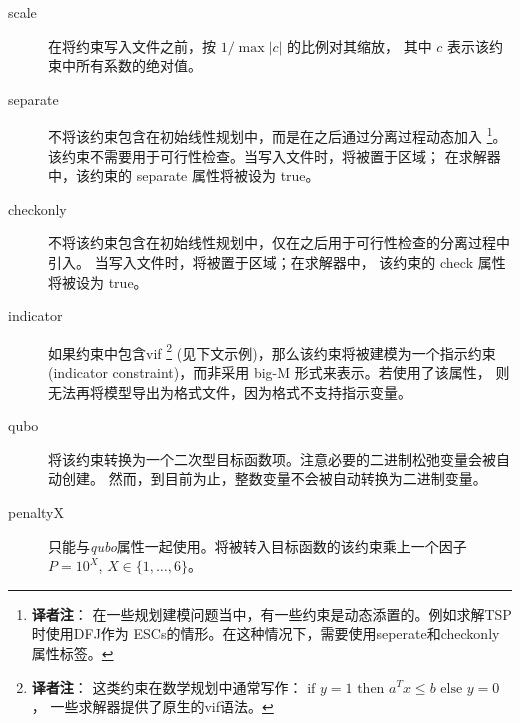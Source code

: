 \begin{description}
\item[scale]
  在将约束写入文件之前，按 $1/\max |c|$ 的比例对其缩放，
  其中 $c$ 表示该约束中所有系数的绝对值。
\item[separate]
  不将该约束包含在初始线性规划中，而是在之后通过分离过程动态加入
  \footnote{\textbf{译者注}：
    在一些规划建模问题当中，有一些约束是动态添置的。例如求解TSP时使用DFJ作为
    ESCs的情形。在这种情况下，需要使用seperate和checkonly属性标签。}。
  该约束不需要用于可行性检查。当写入\lpf 文件时，将被置于区域；
  在\scip 求解器中，该约束的 separate 属性将被设为 true。
\item[checkonly]
  不将该约束包含在初始线性规划中，仅在之后用于可行性检查的分离过程中引入。
  当写入\lpf 文件时，将被置于区域；在\scip 求解器中，
  该约束的 check 属性将被设为 true。
\item[indicator]
  如果约束中包含vif \footnote{\textbf{译者注}：
     这类约束在数学规划中通常写作：
       $\text{if } y = 1 \text{ then } a^T x \le b \text{ else } y=0$，
     一些求解器提供了原生的vif语法。
  } (见下文示例)，那么该约束将被建模为一个指示约束
  (indicator constraint)，而非采用 big-M 形式来表示。若使用了该属性，
  则无法再将模型导出为\mps 格式文件，因为\mps 格式不支持指示变量。
\item[qubo]
  将该约束转换为一个二次型目标函数项。注意必要的二进制松弛变量会被自动创建。
  然而，到目前为止，整数变量不会被自动转换为二进制变量。
\item[penaltyX] 
  只能与\emph{qubo}属性一起使用。将被转入目标函数的该约束乘上一个因子
  $P=10^X$, $X\in\{1,\ldots,6\}$。
\end{description}

